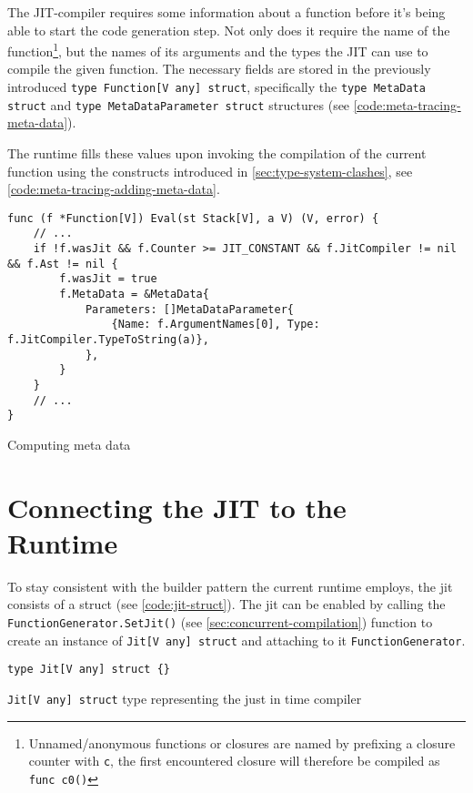 The JIT-compiler requires some information about a function before it's being
able to start the code generation step. Not only does it require the name of
the function\footnote{Unnamed/anonymous functions or closures are named by
prefixing a closure counter with \texttt{c}, the first encountered closure
will therefore be compiled as \texttt{func c0()}}, but the names of its
arguments and the types the JIT can use to compile the given function. The
necessary fields are stored in the previously introduced \texttt{type Function[V any] struct},
specifically the \texttt{type MetaData struct}
and \texttt{type MetaDataParameter struct} structures (see
\autoref{code:meta-tracing-meta-data}).

The runtime fills these values upon invoking the compilation of the current
function using the constructs introduced in
\autoref{sec:type-system-clashes}, see
\autoref{code:meta-tracing-adding-meta-data}. 

\begin{listing}[H]
    \begin{verbatim}
func (f *Function[V]) Eval(st Stack[V], a V) (V, error) {
    // ...
    if !f.wasJit && f.Counter >= JIT_CONSTANT && f.JitCompiler != nil && f.Ast != nil {
        f.wasJit = true
        f.MetaData = &MetaData{
            Parameters: []MetaDataParameter{
                {Name: f.ArgumentNames[0], Type: f.JitCompiler.TypeToString(a)},
            },
        }
    }
    // ...
}
    \end{verbatim}
    \caption{Computing meta data}
    \label{code:meta-tracing-adding-meta-data}
\end{listing}

\section{Connecting the JIT to the Runtime}

To stay consistent with the builder pattern the current runtime employs, the
jit consists of a struct (see \autoref{code:jit-struct}). The jit can be
enabled by calling the \texttt{FunctionGenerator.SetJit()} (see
\autoref{sec:concurrent-compilation}) function to create an instance of
\texttt{Jit[V any] struct} and attaching to it
\texttt{FunctionGenerator}. 

\begin{listing}[H]
    \begin{verbatim}
type Jit[V any] struct {}
    \end{verbatim}
    \caption{\texttt{Jit[V any] struct} type representing the just in time compiler}
    \label{code:jit-struct}
\end{listing}


